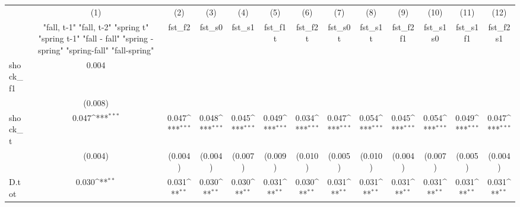 {
\def\sym#1{\ifmmode^{#1}\else\(^{#1}\)\fi}
\begin{tabular}{l*{12}{c}}
\toprule
            &\multicolumn{1}{c}{(1)}&\multicolumn{1}{c}{(2)}&\multicolumn{1}{c}{(3)}&\multicolumn{1}{c}{(4)}&\multicolumn{1}{c}{(5)}&\multicolumn{1}{c}{(6)}&\multicolumn{1}{c}{(7)}&\multicolumn{1}{c}{(8)}&\multicolumn{1}{c}{(9)}&\multicolumn{1}{c}{(10)}&\multicolumn{1}{c}{(11)}&\multicolumn{1}{c}{(12)}\\
            &\multicolumn{1}{c}{  "fall, t-1" "fall, t-2" "spring t" "spring t-1"  "fall - fall" "spring - spring" "spring-fall" "fall-spring" }&\multicolumn{1}{c}{fst\_f2}&\multicolumn{1}{c}{fst\_s0}&\multicolumn{1}{c}{fst\_s1}&\multicolumn{1}{c}{fst\_f1t}&\multicolumn{1}{c}{fst\_f2t}&\multicolumn{1}{c}{fst\_s0t}&\multicolumn{1}{c}{fst\_s1t}&\multicolumn{1}{c}{fst\_f2f1}&\multicolumn{1}{c}{fst\_s1s0}&\multicolumn{1}{c}{fst\_s1f1}&\multicolumn{1}{c}{fst\_f2s1}\\
\midrule
shock\_f1    &       0.004         &                     &                     &                     &                     &                     &                     &                     &                     &                     &                     &                     \\
            &     (0.008)         &                     &                     &                     &                     &                     &                     &                     &                     &                     &                     &                     \\
\addlinespace
shock\_t     &       0.047\sym{***}&       0.047\sym{***}&       0.048\sym{***}&       0.045\sym{***}&       0.049\sym{***}&       0.034\sym{***}&       0.047\sym{***}&       0.054\sym{***}&       0.045\sym{***}&       0.054\sym{***}&       0.049\sym{***}&       0.047\sym{***}\\
            &     (0.004)         &     (0.004)         &     (0.004)         &     (0.007)         &     (0.009)         &     (0.010)         &     (0.005)         &     (0.010)         &     (0.004)         &     (0.007)         &     (0.005)         &     (0.004)         \\
\addlinespace
D.tot       &       0.030\sym{**} &       0.031\sym{**} &       0.030\sym{**} &       0.030\sym{**} &       0.031\sym{**} &       0.030\sym{**} &       0.031\sym{**} &       0.031\sym{**} &       0.031\sym{**} &       0.031\sym{**} &       0.031\sym{**} &       0.031\sym{**} \\

\end{tabular}}

